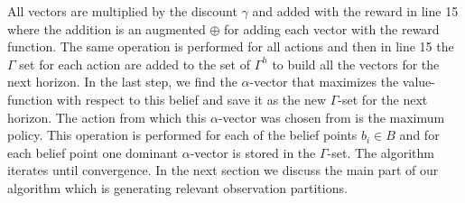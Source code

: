 \documentclass{article} %
\begin{document}
All vectors are multiplied by the discount $\gamma$ and added with the reward in line 15 where the addition is an augmented $\oplus$ for adding each vector with the reward function. 
The same operation is performed for all actions and then in line 15 the $\Gamma$ set for each action are added to the set of $\Gamma^h$ to build all the vectors for the next horizon. 
In the last step, we find the $\alpha$-vector that maximizes the value-function with respect to this belief and save it as the new $\Gamma$-set for the next horizon. The action from which this $\alpha$-vector was chosen from is the maximum policy. 
This operation is performed for each of the belief points $b_i \in B$ and for each belief point one dominant $\alpha$-vector is stored in the $\Gamma$-set. The algorithm iterates until convergence. 
In the next section we discuss the main part of our algorithm which is generating relevant observation partitions.
%
%   
\end{document}
